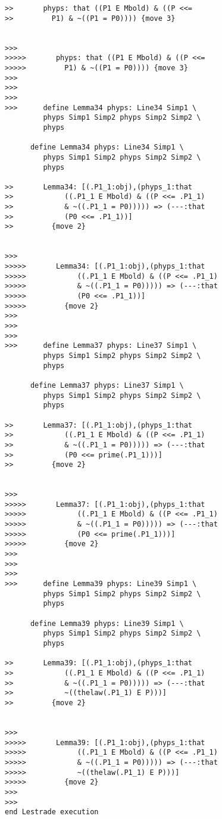 \documentclass[12pt]{article}
\begin{document}
\begin{verbatim}
>>       phyps: that ((P1 E Mbold) & ((P <<=
>>         P1) & ~((P1 = P0)))) {move 3}


>>>
>>>>>       phyps: that ((P1 E Mbold) & ((P <<=
>>>>>         P1) & ~((P1 = P0)))) {move 3}
>>>
>>>
>>>
>>>      define Lemma34 phyps: Line34 Simp1 \
         phyps Simp1 Simp2 phyps Simp2 Simp2 \
         phyps

      define Lemma34 phyps: Line34 Simp1 \
         phyps Simp1 Simp2 phyps Simp2 Simp2 \
         phyps

>>       Lemma34: [(.P1_1:obj),(phyps_1:that
>>            ((.P1_1 E Mbold) & ((P <<= .P1_1)
>>            & ~((.P1_1 = P0))))) => (---:that
>>            (P0 <<= .P1_1))]
>>         {move 2}


>>>
>>>>>       Lemma34: [(.P1_1:obj),(phyps_1:that
>>>>>            ((.P1_1 E Mbold) & ((P <<= .P1_1)
>>>>>            & ~((.P1_1 = P0))))) => (---:that
>>>>>            (P0 <<= .P1_1))]
>>>>>         {move 2}
>>>
>>>
>>>
>>>      define Lemma37 phyps: Line37 Simp1 \
         phyps Simp1 Simp2 phyps Simp2 Simp2 \
         phyps

      define Lemma37 phyps: Line37 Simp1 \
         phyps Simp1 Simp2 phyps Simp2 Simp2 \
         phyps

>>       Lemma37: [(.P1_1:obj),(phyps_1:that
>>            ((.P1_1 E Mbold) & ((P <<= .P1_1)
>>            & ~((.P1_1 = P0))))) => (---:that
>>            (P0 <<= prime(.P1_1)))]
>>         {move 2}


>>>
>>>>>       Lemma37: [(.P1_1:obj),(phyps_1:that
>>>>>            ((.P1_1 E Mbold) & ((P <<= .P1_1)
>>>>>            & ~((.P1_1 = P0))))) => (---:that
>>>>>            (P0 <<= prime(.P1_1)))]
>>>>>         {move 2}
>>>
>>>
>>>
>>>      define Lemma39 phyps: Line39 Simp1 \
         phyps Simp1 Simp2 phyps Simp2 Simp2 \
         phyps

      define Lemma39 phyps: Line39 Simp1 \
         phyps Simp1 Simp2 phyps Simp2 Simp2 \
         phyps

>>       Lemma39: [(.P1_1:obj),(phyps_1:that
>>            ((.P1_1 E Mbold) & ((P <<= .P1_1)
>>            & ~((.P1_1 = P0))))) => (---:that
>>            ~((thelaw(.P1_1) E P)))]
>>         {move 2}


>>>
>>>>>       Lemma39: [(.P1_1:obj),(phyps_1:that
>>>>>            ((.P1_1 E Mbold) & ((P <<= .P1_1)
>>>>>            & ~((.P1_1 = P0))))) => (---:that
>>>>>            ~((thelaw(.P1_1) E P)))]
>>>>>         {move 2}
>>>
>>>
end Lestrade execution
\end{verbatim}
\end{document}
